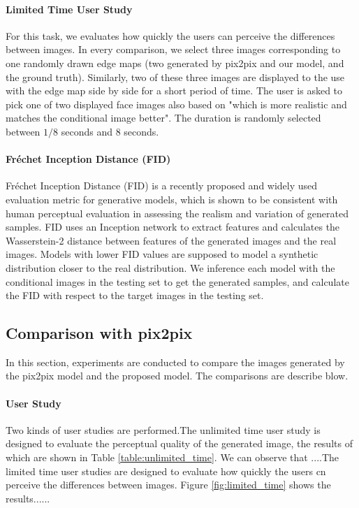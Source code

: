 \paragraph{Limited Time User Study}
For this task, we evaluates how quickly the users can perceive the differences between images. In every comparison, we  select three images corresponding to one randomly drawn edge maps (two generated by pix2pix and our model, and the ground truth). Similarly, two of these three images are displayed to the use with the edge map side by side for a short period of time. The user is asked to pick one of two displayed face images also based on "which is more realistic and matches the conditional image better". The duration is randomly selected between $1/8$ seconds and $8$ seconds. 
\paragraph{Fr\'echet Inception Distance (FID)}
Fr\'echet Inception Distance (FID) \cite{FID} is a recently proposed and widely used evaluation metric for generative models, which is shown to be consistent with human perceptual evaluation in assessing the realism and variation of generated samples. FID uses an Inception network to extract features and calculates the Wasserstein-2 distance between features of the generated images and the real images. Models with lower FID values are supposed to model a synthetic distribution closer to the real distribution. We inference each model with the conditional images in the testing set to get the generated samples, and calculate the FID with respect to the target images in the testing set.
%
%
\subsection{Comparison with pix2pix}
%
In this section, experiments are conducted to compare the images generated by the pix2pix model and the proposed model. The comparisons are describe blow.
\paragraph{User Study} Two kinds of user studies are performed.The unlimited time user study is designed to evaluate the perceptual quality of the generated image, the results of which are shown in Table \ref{table:unlimited_time}. We can observe that ....The limited time user studies are designed to evaluate how quickly the users cn perceive the differences between images. Figure \ref{fig:limited_time} shows the results......
